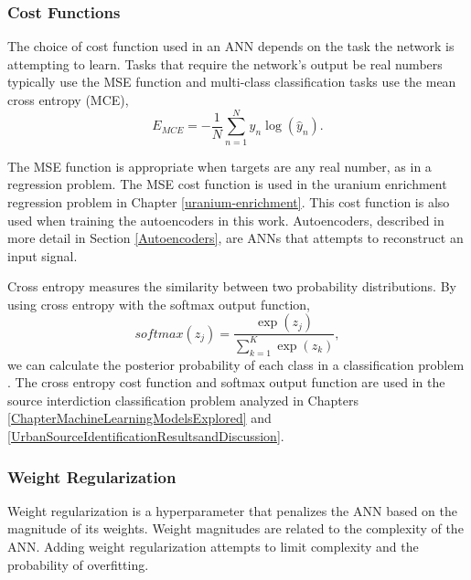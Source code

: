 \subsubsection{Cost Functions}

The choice of cost function used in an ANN depends on the task the network is attempting to learn. Tasks that require the network's output be real numbers typically use the MSE function and multi-class classification tasks use the mean cross entropy (MCE),
%
\begin{equation} \label{eq:CrossEntropy}
E_{MCE} = -{\frac{1} N} \sum_{n=1}^N y_n \log(\hat{y}_n).
\end{equation}
%

The MSE function is appropriate when targets are any real number, as in a regression problem. The MSE cost function is used in the uranium enrichment regression problem in Chapter \ref{uranium-enrichment}. This cost function is also used when training the autoencoders in this work. Autoencoders, described in more detail in Section \ref{Autoencoders}, are ANNs that attempts to reconstruct an input signal.

Cross entropy measures the similarity between two probability distributions. By using cross entropy with the softmax output function,
%
\begin{equation} \label{eq:softmax}
softmax(z_j) = \frac{\exp(z_j)} {\sum_{k=1}^{K} \exp(z_k)},
\end{equation}
%
we can calculate the posterior probability of each class in a classification problem \cite{Bridle1990}. The cross entropy cost function and softmax output function are used in the source interdiction classification problem analyzed in Chapters \ref{ChapterMachineLearningModelsExplored} and \ref{UrbanSourceIdentificationResultsandDiscussion}.



\subsubsection{Weight Regularization}

Weight regularization is a hyperparameter that penalizes the ANN based on the magnitude of its weights. Weight magnitudes are related to the complexity of the ANN. Adding weight regularization attempts to limit complexity and the probability of overfitting.

